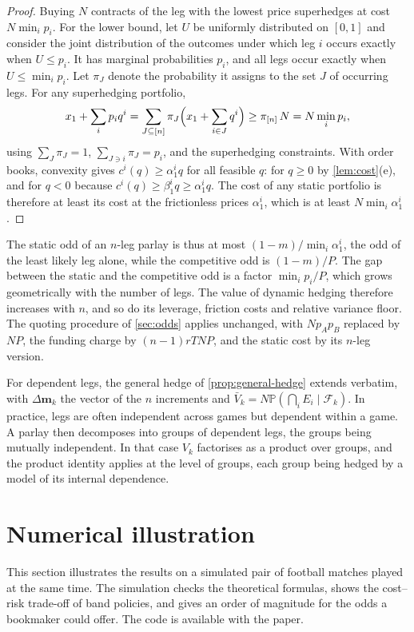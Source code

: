 \documentclass[11pt,a4paper]{article}
\theoremstyle{plain}
\theoremstyle{definition}
\theoremstyle{remark}
\newcommand{\Prob}{\mathbb{P}}
\newcommand{\1}{\mathbf{1}}
\newcommand{\F}{\mathcal{F}}
\begin{document}
\begin{proof}
Buying $N$ contracts of the leg with the lowest price superhedges at cost $N\min_ip_i$. For the lower bound, let $U$ be uniformly distributed on $[0,1]$ and consider the joint distribution of the outcomes under which leg $i$ occurs exactly when $U\leq p_i$. It has marginal probabilities $p_i$, and all legs occur exactly when $U\leq\min_ip_i$. Let $\pi_J$ denote the probability it assigns to the set $J$ of occurring legs. For any superhedging portfolio,
\[
x_1 + \sum_ip_iq^i = \sum_{J\subseteq[n]}\pi_J\Bigl(x_1 + \sum_{i\in J}q^i\Bigr)\geq\pi_{[n]}\,N = N\min_ip_i,
\]
using $\sum_J\pi_J = 1$, $\sum_{J\ni i}\pi_J = p_i$, and the superhedging constraints. With order books, convexity gives $c^i(q)\geq\alpha^i_1 q$ for all feasible $q$: for $q\geq 0$ by \cref{lem:cost}(e), and for $q<0$ because $c^i(q)\geq\beta^i_1q\geq\alpha^i_1q$. The cost of any static portfolio is therefore at least its cost at the frictionless prices $\alpha^i_1$, which is at least $N\min_i\alpha^i_1$.
\end{proof}

The static odd of an $n$-leg parlay is thus at most $(1-m)/\min_i\alpha^i_1$, the odd of the least likely leg alone, while the competitive odd is $(1-m)/P$. The gap between the static and the competitive odd is a factor $\min_ip_i/P$, which grows geometrically with the number of legs. The value of dynamic hedging therefore increases with $n$, and so do its leverage, friction costs and relative variance floor. The quoting procedure of \cref{sec:odds} applies unchanged, with $Np_Ap_B$ replaced by $NP$, the funding charge by $(n-1)rTNP$, and the static cost by its $n$-leg version.

For dependent legs, the general hedge of \cref{prop:general-hedge} extends verbatim, with $\Delta\mathbf{m}_k$ the vector of the $n$ increments and $\bar V_k = N\Prob(\bigcap_iE_i\mid\F_k)$. In practice, legs are often independent across games but dependent within a game. A parlay then decomposes into groups of dependent legs, the groups being mutually independent. In that case $V_k$ factorises as a product over groups, and the product identity applies at the level of groups, each group being hedged by a model of its internal dependence.

\section{Numerical illustration}
\label{sec:numerics}
This section illustrates the results on a simulated pair of football matches played at the same time. The simulation checks the theoretical formulas, shows the cost--risk trade-off of band policies, and gives an order of magnitude for the odds a bookmaker could offer. The code is available with the paper.
\end{document}
